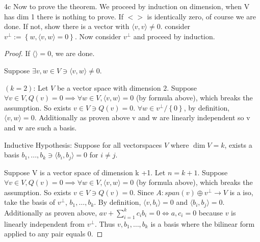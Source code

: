 \documentclass{article}
\newcommand{\angles}[1]{\langle #1 \rangle}
\begin{document}
\begin{claim}{4c}\label{Claim 4c.}
    Now to prove the theorem.  We proceed by induction on dimension, when V has dim 1 there is nothing to prove.  If $< >$ is identically zero, of course we are done. If not, show there is a vector with $\angles{v, v} \neq 0$. consider $v^{\perp} := \left\{ w, \angles{v,w} = 0 \right\}$. Now consider $v^{\perp}$ and proceed by induction.
\end{claim}
\begin{proof} 
    If $\angles{} = 0$, we are done.

    Suppose $\exists v, w \in V \ni \angles{v, w} \neq 0$. 

    $(k = 2)$: Let $V$ be a vector space with dimension $2$. Suppose $\forall v \in V, Q(v) = 0 \implies \forall w \in V, \angles{v, w} = 0$ (by formula above), which breaks the assumption. So exists $v \in V \ni Q(v) = 0$. $\forall w \in v^\perp / \left\{ 0 \right\}$, by definition, $\angles{v, w} = 0$. Additionally as proven above v and w are linearly independent so v and w are such a basis.   
    
    Inductive Hypothesis: Suppose for all vectorspaces $V$ where $\dim V = k$, exists a basis $b_1, ..., b_k \ni \angles{b_i, b_j} = 0$ for $i \neq j$. 
    
    
    Suppose V is a vector space of dimension k +1. Let $n = k + 1$. Suppose $\forall v \in V, Q(v) = 0 \implies \forall w \in V, \angles{v, w} = 0$ (by formula above), which breaks the assumption. So exists $v \in V \ni Q(v) = 0$. Since $A:  span(v) \oplus v^\perp \to V$ is a iso, take the basis of $v^\perp$, $b_1, \dots, b_k$. By definition, $\angles{v, b_i} = 0$ and $\angles{b_i, b_j} = 0$. Additionally as proven above, $av + \sum_{i=1}^{k}c_ib_i = 0 \iff a, c_i = 0$ because $v$ is linearly independent from $v^\perp$. Thus $v, b_1, \dots, b_k$ is a basis where the bilinear form applied to any pair equals 0.          
    
\end{proof}
\end{document}

